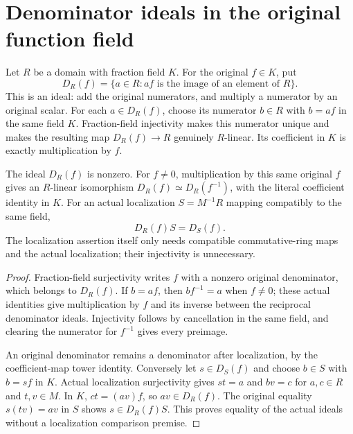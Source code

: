 \section{Denominator ideals in the original function field}

\begin{definition}
\label{def:fc-rational-denominator-ideals}
\leanok
{}
Let $R$ be a domain with fraction field $K$. For the original $f\in K$, put
\[
 D_R(f)=\{a\in R: af\text{ is the image of an element of }R\}.
\]
This is an ideal: add the original numerators, and multiply a numerator by
an original scalar. For each $a\in D_R(f)$, choose its numerator $b\in R$
with $b=af$ in the same field $K$. Fraction-field injectivity makes this
numerator unique and makes the resulting map $D_R(f)\to R$ genuinely
$R$-linear. Its coefficient in $K$ is exactly multiplication by $f$.
\end{definition}

\begin{theorem}
\label{thm:fc-rational-denominator-localization}
\leanok
{}
The ideal $D_R(f)$ is nonzero. For $f\ne0$, multiplication by this same
original $f$ gives an $R$-linear isomorphism
$D_R(f)\simeq D_R(f^{-1})$, with the literal coefficient identity in $K$.
For an actual localization $S=M^{-1}R$ mapping compatibly to the same field,
\[
 D_R(f)S=D_S(f).
\]
The localization assertion itself only needs compatible commutative-ring
maps and the actual localization; their injectivity is unnecessary.
\end{theorem}
\begin{proof}
Fraction-field surjectivity writes $f$ with a nonzero original denominator,
which belongs to $D_R(f)$. If $b=af$, then $bf^{-1}=a$ when $f\ne0$;
these actual identities give multiplication by $f$ and its inverse between
the reciprocal denominator ideals. Injectivity follows by cancellation
in the same field, and clearing the numerator for $f^{-1}$ gives every
preimage.

An original denominator remains a denominator after localization, by the
coefficient-map tower identity. Conversely let $s\in D_S(f)$ and choose
$b\in S$ with $b=sf$ in $K$. Actual localization surjectivity gives
$st=a$ and $bv=c$ for $a,c\in R$ and $t,v\in M$. In $K$,
$ct=(av)f$, so $av\in D_R(f)$. The original equality
$s(tv)=av$ in $S$ shows $s\in D_R(f)S$. This proves equality of the
actual ideals without a localization comparison premise.
\end{proof}
